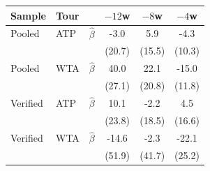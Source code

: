 \begin{tabular}{lll*{3}{c}}
\toprule
Sample & Tour & & $-12$w & $-8$w & $-4$w \\
\midrule
Pooled & ATP & $\hat{\beta}$ & -3.0 & 5.9 & -4.3 \\
 & & & (20.7) & (15.5) & (10.3) \\[0.3em]
Pooled & WTA & $\hat{\beta}$ & 40.0 & 22.1 & -15.0 \\
 & & & (27.1) & (20.8) & (11.8) \\[0.3em]
Verified & ATP & $\hat{\beta}$ & 10.1 & -2.2 & 4.5 \\
 & & & (23.8) & (18.5) & (16.6) \\[0.3em]
Verified & WTA & $\hat{\beta}$ & -14.6 & -2.3 & -22.1 \\
 & & & (51.9) & (41.7) & (25.2) \\[0.3em]
\bottomrule
\end{tabular}
